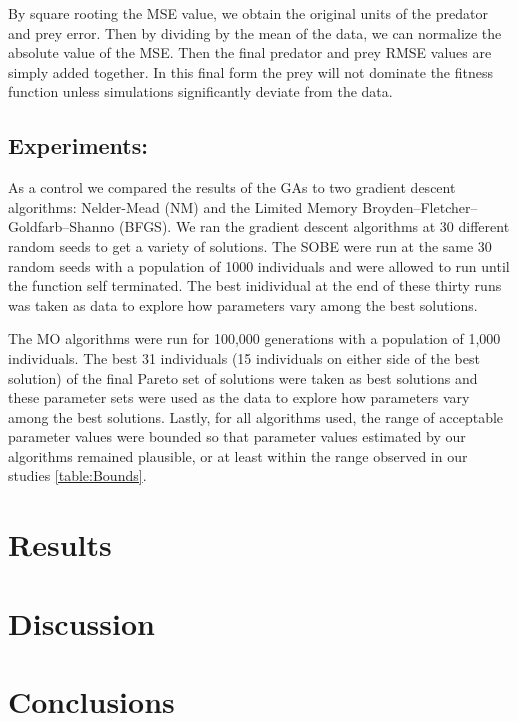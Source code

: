 \documentclass[twocolumn, 12pt]{article}
\begin{document}
By square rooting the MSE value, we obtain the original units of the predator and prey error. Then by dividing by the mean of the data, we can normalize the absolute value of the MSE. Then the final predator and prey RMSE values are simply added together. In this final form the prey will not dominate the fitness function unless simulations significantly deviate from the data.  

\subsection{Experiments:}

As a control we compared the results of the GAs to two gradient descent algorithms: Nelder-Mead (NM) and the Limited Memory Broyden–Fletcher–Goldfarb–Shanno (BFGS). We ran the gradient descent algorithms at 30 different random seeds to get a variety of solutions. The SOBE were run at the same 30 random seeds with a population of 1000 individuals and were allowed to run until the function self terminated. The best inidividual at the end of these thirty runs was taken as data to explore how parameters vary among the best solutions.

The MO algorithms were run for 100,000 generations with a population of 1,000 individuals. The best 31 individuals (15 individuals on either side of the best solution) of the final Pareto set of solutions were taken as best solutions and these parameter sets were used as the data to explore how parameters vary among the best solutions. Lastly, for all algorithms used, the range of acceptable parameter values were bounded so that parameter values estimated by our algorithms remained plausible, or at least within the range observed in our studies \ref{table:Bounds}. 






\section{Results}

\section{Discussion}

\section{Conclusions}
\end{document}

